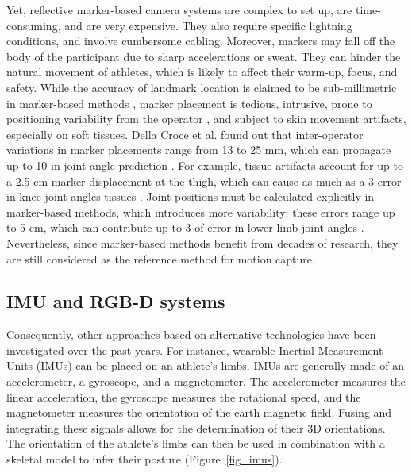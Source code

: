 Yet, reflective marker-based camera systems are complex to set up, are time-consuming, and are very expensive. They also require specific lightning conditions, and involve cumbersome cabling. Moreover, markers may fall off the body of the participant due to sharp accelerations or sweat. They can hinder the natural movement of athletes, which is likely to affect their warm-up, focus, and safety. While the accuracy of landmark location is claimed to be sub-millimetric in marker-based methods \cite{Topley2020}, marker placement is tedious, intrusive, prone to positioning variability from the operator \cite{Tsushima2003}, and subject to skin movement artifacts, especially on soft tissues. Della Croce et al. found out that inter-operator variations in marker placements range from 13 to 25 mm, which can propagate up to 10\degree{} in joint angle prediction \cite{Gorton2009,Croce1999}. For example, tissue artifacts account for up to a 2.5 cm marker displacement at the thigh, which can cause as much as a 3\degree{} error in knee joint angles tissues \cite{Benoit2015,Cappozzo1995}. Joint positions must be calculated explicitly in marker-based methods, which introduces more variability: these errors range up to 5 cm, which can contribute up to 3\degree{} of error in lower limb joint angles \cite{Leboeuf2019}. Nevertheless, since marker-based methods benefit from decades of research, they are still considered as the reference method for motion capture.

\FloatBarrier
\subsection{IMU and RGB-D systems}

Consequently, other approaches based on alternative technologies have been investigated over the past years. For instance, wearable Inertial Measurement Units (IMUs) can be placed on an athlete's limbs. IMUs are generally made of an accelerometer, a gyroscope, and a magnetometer. The accelerometer measures the linear acceleration, the gyroscope measures the rotational speed, and the magnetometer measures the orientation of the earth magnetic field. Fusing and integrating these signals allows for the determination of their 3D orientations. The orientation of the athlete's limbs can then be used in combination with a skeletal model to infer their posture (Figure~\ref{fig_imus}).


